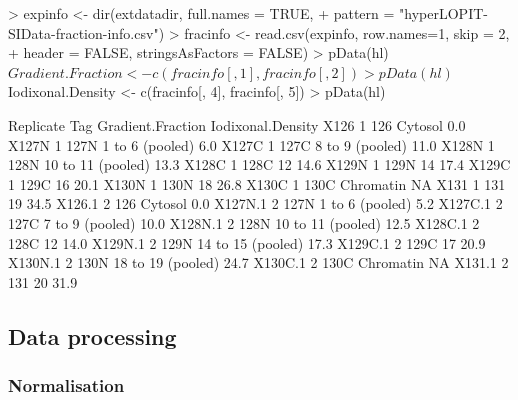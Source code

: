 \begin{Schunk}
\begin{Sinput}
> expinfo <- dir(extdatadir, full.names = TRUE,
+                pattern = "hyperLOPIT-SIData-fraction-info.csv")
> fracinfo <- read.csv(expinfo, row.names=1, skip = 2, 
+                      header = FALSE, stringsAsFactors = FALSE)
> pData(hl)$Gradient.Fraction <- c(fracinfo[, 1], fracinfo[, 2])
> pData(hl)$Iodixonal.Density <- c(fracinfo[, 4], fracinfo[, 5])
> pData(hl)
\end{Sinput}
\begin{Soutput}
        Replicate  Tag Gradient.Fraction Iodixonal.Density
X126            1  126           Cytosol               0.0
X127N           1 127N   1 to 6 (pooled)               6.0
X127C           1 127C   8 to 9 (pooled)              11.0
X128N           1 128N 10 to 11 (pooled)              13.3
X128C           1 128C                12              14.6
X129N           1 129N                14              17.4
X129C           1 129C                16              20.1
X130N           1 130N                18              26.8
X130C           1 130C         Chromatin                NA
X131            1  131                19              34.5
X126.1          2  126           Cytosol               0.0
X127N.1         2 127N   1 to 6 (pooled)               5.2
X127C.1         2 127C   7 to 9 (pooled)              10.0
X128N.1         2 128N 10 to 11 (pooled)              12.5
X128C.1         2 128C                12              14.0
X129N.1         2 129N 14 to 15 (pooled)              17.3
X129C.1         2 129C                17              20.9
X130N.1         2 130N 18 to 19 (pooled)              24.7
X130C.1         2 130C         Chromatin                NA
X131.1          2  131                20              31.9
\end{Soutput}
\end{Schunk}

\subsection*{Data processing}

\subsubsection*{Normalisation}

